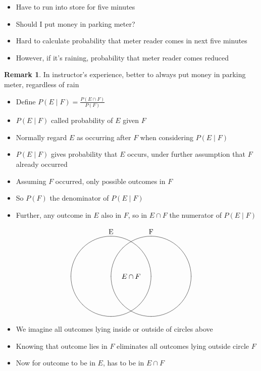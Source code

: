 \documentclass[handout]{beamer}
\theoremstyle{definition}
\newtheorem{remark}{Remark}
\begin{document}
\begin{frame}
\begin{example}
\begin{itemize}
\item Have to run into store for five minutes
\item Should I put money in parking meter?
\item Hard to calculate probability that meter reader
comes in next five minutes
\item However, if it's raining, probability that meter reader
comes reduced
\end{itemize}
\end{example}
\begin{remark}
In instructor's experience, better to always put money
in parking meter, regardless of rain
\end{remark}
\end{frame}

\begin{frame}
\begin{definition}
\begin{itemize}
\item Define $P\left(E\mid F\right)
=\frac{P\left(E\cap F\right)}{P\left(F\right)}$
\item $P\left(E\mid F\right)$ called
\alert{probability of $E$ given $F$}
\end{itemize}
\end{definition}
\begin{itemize}
\item Normally regard $E$ as occurring
\alert{after} $F$ when considering $P\left(E\mid F\right)$
\item $P\left(E\mid F\right)$ gives probability that $E$ occurs,
under further assumption that $F$ already occurred
\item Assuming $F$ occurred, only possible outcomes in $F$
\item So $P\left(F\right)$ the denominator of $P\left(E\mid F\right)$
\item Further, any outcome in $E$
also in $F$, so in $E\cap F$ the numerator of
$P\left(E\mid F\right)$
\end{itemize}
\end{frame}

\begin{frame}
\[\begin{xy}<1cm,0cm>:
(-1,2)*+!D{\text{E}};
(1,2)*+!D{\text{F}};
(-1,0)*\cir<2cm>{};
(1,0)*\cir<2cm>{};
(0,0)*{E\cap F};
\end{xy}\]
\begin{itemize}
\item We imagine all outcomes lying inside
or outside of circles above
\item Knowing that outcome lies in $F$
eliminates all outcomes lying outside circle $F$
\item Now for outcome to be in $E$, has to be in $E\cap F$
\end{itemize}
\end{frame}
\end{document}
